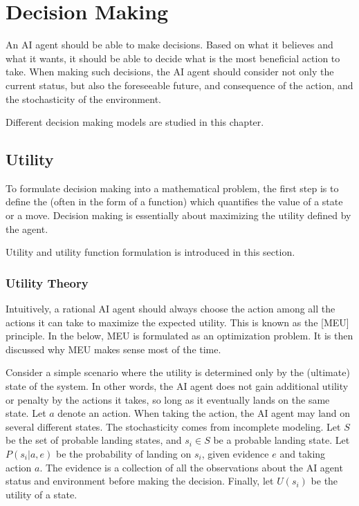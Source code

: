 \chapter{Decision Making}

An AI agent should be able to make decisions. Based on what it believes and what it wants, it should be able to decide what is the most beneficial action to take. When making such decisions, the AI agent should consider not only the current status, but also the foreseeable future, and consequence of the action, and the stochasticity of the environment.

Different decision making models are studied in this chapter.

\section{Utility}

To formulate decision making into a mathematical problem, the first step is to define the  (often in the form of a function) which quantifies the value of a state or a move. Decision making is essentially about maximizing the utility defined by the agent.

Utility and utility function formulation is introduced in this section.

\subsection{Utility Theory}

Intuitively, a rational AI agent should always choose the action among all the actions it can take to maximize the expected utility. This is known as the [MEU] principle. In the below, MEU is formulated as an optimization problem. It is then discussed why MEU makes sense most of the time.

Consider a simple scenario where the utility is determined only by the (ultimate) state of the system. In other words, the AI agent does not gain additional utility or penalty by the actions it takes, so long as it eventually lands on the same state. Let $a$ denote an action. When taking the action, the AI agent may land on several different states. The stochasticity comes from incomplete modeling. Let $S$ be the set of probable landing states, and $s_i\in S$ be a probable landing state. Let $P(s_i|a,e)$ be the probability of landing on $s_i$, given evidence $e$ and taking action $a$. The evidence is a collection of all the observations about the AI agent status and environment before making the decision. Finally, let $U(s_i)$ be the utility of a state.

